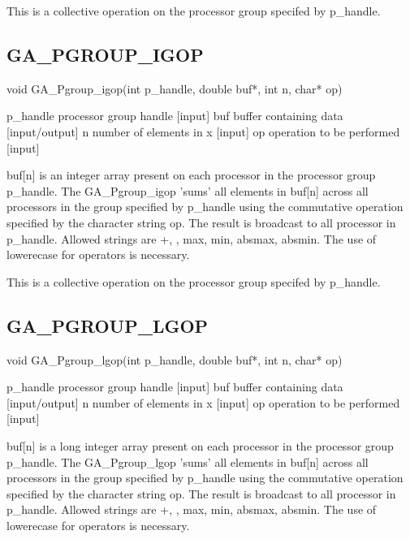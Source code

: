 This is a collective operation on the processor group specifed by
p\_handle. 


\subsection*{GA\_PGROUP\_IGOP}

void GA\_Pgroup\_igop(int p\_handle, double buf{*}, int n, char{*}
op)

p\_handle processor group handle {[}input{]} buf buffer containing
data {[}input/output{]} n number of elements in x {[}input{]} op operation
to be performed {[}input{]}

buf{[}n{]} is an integer array present on each processor in the processor
group p\_handle. The GA\_Pgroup\_igop 'sums' all elements in buf{[}n{]}
across all processors in the group specified by p\_handle using the
commutative operation specified by the character string op. The result
is broadcast to all processor in p\_handle. Allowed strings are \textquotedbl{}+\textquotedbl{},
\textquotedbl{}{*}\textquotedbl{}, \textquotedbl{}max\textquotedbl{},
\textquotedbl{}min\textquotedbl{}, \textquotedbl{}absmax\textquotedbl{},
\textquotedbl{}absmin\textquotedbl{}. The use of lowerecase for operators
is necessary.

This is a collective operation on the processor group specifed by
p\_handle. 


\subsection*{GA\_PGROUP\_LGOP}

void GA\_Pgroup\_lgop(int p\_handle, double buf{*}, int n, char{*}
op)

p\_handle processor group handle {[}input{]} buf buffer containing
data {[}input/output{]} n number of elements in x {[}input{]} op operation
to be performed {[}input{]}

buf{[}n{]} is a long integer array present on each processor in the
processor group p\_handle. The GA\_Pgroup\_lgop 'sums' all elements
in buf{[}n{]} across all processors in the group specified by p\_handle
using the commutative operation specified by the character string
op. The result is broadcast to all processor in p\_handle. Allowed
strings are \textquotedbl{}+\textquotedbl{}, \textquotedbl{}{*}\textquotedbl{},
\textquotedbl{}max\textquotedbl{}, \textquotedbl{}min\textquotedbl{},
\textquotedbl{}absmax\textquotedbl{}, \textquotedbl{}absmin\textquotedbl{}.
The use of lowerecase for operators is necessary.

